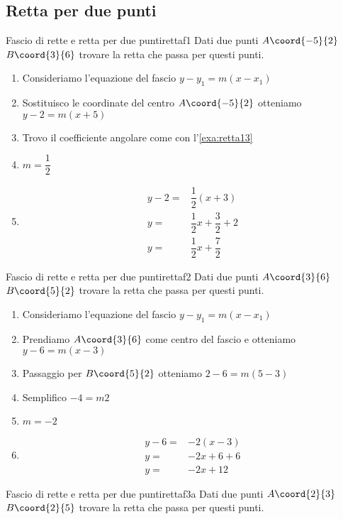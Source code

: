 \subsection{Retta per due punti}
\begin{esempiot}{Fascio di rette e retta per due punti}{rettaf1}
Dati due punti $A\coord{-5}{2}$ $B\coord{3}{6}$ trovare la retta che passa per questi punti.
\end{esempiot}
\begin{enumerate}
	\item Consideriamo l'equazione del fascio $y-y_1=m(x-x_1)$
	\item Sostituisco le coordinate del centro $A\coord{-5}{2}$ otteniamo $y-2=m(x+5)$
	\item Trovo il coefficiente angolare come con l'\cref{exa:retta13}
	\item $m=\dfrac{1}{2}$
	\item \begin{align*}
		y-2=&\dfrac{1}{2}(x+3)\\
		y=&\dfrac{1}{2}x+\dfrac{3}{2}+2\\
		y=&\dfrac{1}{2}x+\dfrac{7}{2}
	\end{align*}
\end{enumerate}
\begin{esempiot}{Fascio di rette e retta per due punti}{rettaf2}
	Dati due punti $A\coord{3}{6}$ $B\coord{5}{2}$ trovare la retta che passa per questi punti.
\end{esempiot}
\begin{enumerate}
	\item Consideriamo l'equazione del fascio $y-y_1=m(x-x_1)$
	\item Prendiamo  $A\coord{3}{6}$ come centro del fascio e otteniamo $y-6=m(x-3)$
	\item Passaggio per $B\coord{5}{2}$ otteniamo $2-6=m(5-3)$
	\item Semplifico $-4=m2$
	\item $m=-2$
	\item \begin{align*}
		y-6=&-2(x-3)\\
		y=&-2x+6+6\\
		y=&-2x+12
	\end{align*}
\end{enumerate}
\begin{cesempiot}{Fascio di rette e retta per due punti}{rettaf3a}
	Dati due punti $A\coord{2}{3}$ $B\coord{2}{5}$ trovare la retta che passa per questi punti.
\end{cesempiot}

